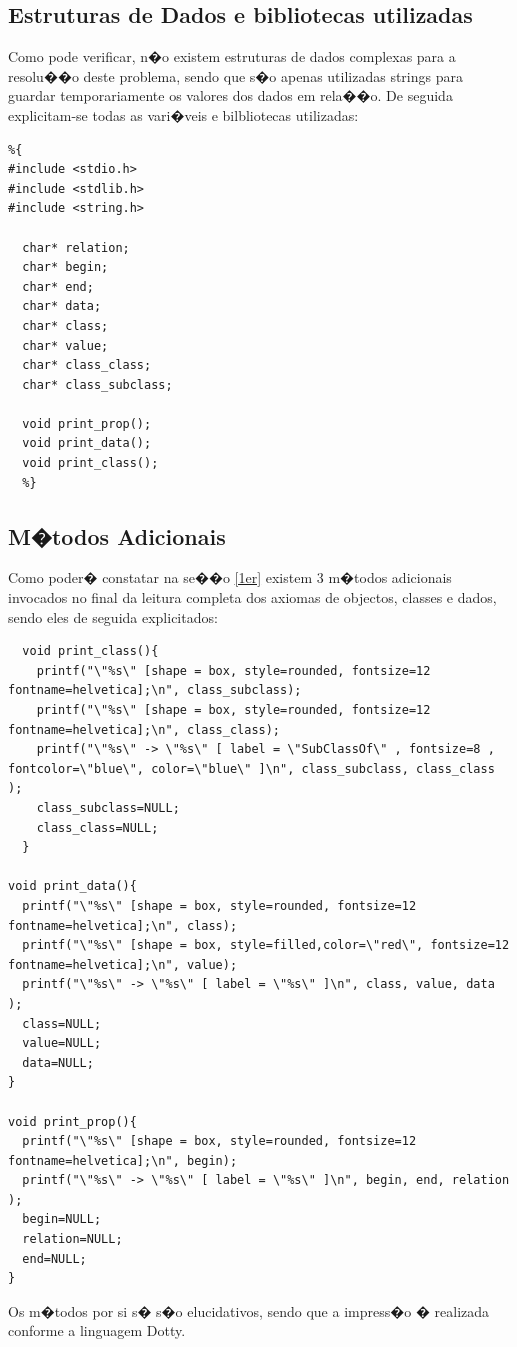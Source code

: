 \documentclass{report}
\begin{document}
\subsection{Estruturas de Dados e bibliotecas utilizadas}
Como pode verificar, n�o existem estruturas de dados complexas para a resolu��o deste problema, sendo que s�o apenas utilizadas strings para guardar temporariamente os valores dos dados em rela��o. De seguida explicitam-se todas as vari�veis e bilbliotecas utilizadas:
\begin{lstlisting}
%{
#include <stdio.h>
#include <stdlib.h>
#include <string.h>

  char* relation;
  char* begin;
  char* end;
  char* data;
  char* class;
  char* value;
  char* class_class;
  char* class_subclass;

  void print_prop();
  void print_data();
  void print_class();
  %}

  \end{lstlisting}

  \subsection{M�todos Adicionais}
  Como poder� constatar na se��o \ref{1er} existem 3 m�todos adicionais invocados no final da leitura completa dos axiomas de objectos, classes e dados, sendo eles de seguida explicitados:

  \begin{lstlisting}
  void print_class(){
    printf("\"%s\" [shape = box, style=rounded, fontsize=12 fontname=helvetica];\n", class_subclass);
    printf("\"%s\" [shape = box, style=rounded, fontsize=12 fontname=helvetica];\n", class_class);
    printf("\"%s\" -> \"%s\" [ label = \"SubClassOf\" , fontsize=8 , fontcolor=\"blue\", color=\"blue\" ]\n", class_subclass, class_class );
    class_subclass=NULL;
    class_class=NULL;
  }

void print_data(){
  printf("\"%s\" [shape = box, style=rounded, fontsize=12 fontname=helvetica];\n", class);
  printf("\"%s\" [shape = box, style=filled,color=\"red\", fontsize=12 fontname=helvetica];\n", value);
  printf("\"%s\" -> \"%s\" [ label = \"%s\" ]\n", class, value, data );
  class=NULL;
  value=NULL;
  data=NULL;
}

void print_prop(){
  printf("\"%s\" [shape = box, style=rounded, fontsize=12 fontname=helvetica];\n", begin);
  printf("\"%s\" -> \"%s\" [ label = \"%s\" ]\n", begin, end, relation );
  begin=NULL;
  relation=NULL;
  end=NULL;
}
\end{lstlisting}
Os m�todos por si s� s�o elucidativos, sendo que a impress�o � realizada conforme a linguagem Dotty.
\end{document}
